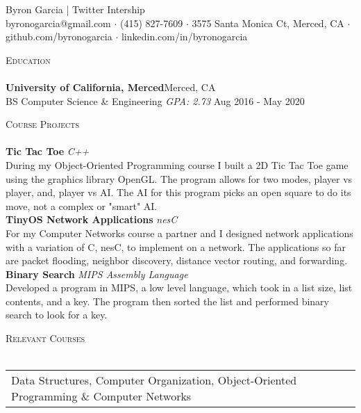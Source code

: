 \documentclass[a4paper]{article}
\newcommand{\lineunder} {
    \vspace*{-8pt} \\
    \hspace*{-18pt} \hrulefill \\
}
\newcommand{\header} [1] {
    {\hspace*{-18pt}\vspace*{6pt} \textsc{#1}}
    \vspace*{-6pt} \lineunder
}
\begin{document}
\vspace*{-40pt}

    

\vspace*{-10pt}
\begin{center}
	{\Huge {Byron Garcia |} \textcolor {twit}{Twitter Intership}}\\
	byronogarcia@gmail.com $\cdot$ (415) 827-7609 $\cdot$ 3575 Santa Monica Ct, Merced, CA $\cdot$ github.com/byronogarcia $\cdot$ linkedin.com/in/byronogarcia \\
\end{center}

\header{Education}
\textbf{University of California, Merced}\hfill Merced, CA\\
BS Computer Science \& Engineering \textit{GPA: 2.73} \hfill Aug 2016 - May 2020\\
\vspace{3mm}

\header{Course Projects}
{\textbf{Tic Tac Toe}} {\sl C++} \\
During my Object-Oriented Programming course I built a 2D Tic Tac Toe game using the graphics library OpenGL. The program allows for two modes, player vs player, and, player vs AI. The AI for this program picks an open square to do its move, not a complex or "smart" AI.\\
\vspace*{3mm}
{\textbf{TinyOS Network Applications}} {\sl nesC} \\
For my Computer Networks course a partner and I designed network applications with a variation of C, nesC, to implement on a network. The applications so far are packet flooding, neighbor discovery, distance vector routing, and forwarding.\\
\vspace*{3mm}
{\textbf{Binary Search}} {\sl MIPS Assembly Language} \\
Developed a program in MIPS, a low level language, which took in a list size, list contents, and a key. The program then sorted the list and performed binary search to look for a key.\\
\vspace*{3mm}

\header{Relevant Courses}
\begin{tabular}{ l l }
Data Structures, Computer Organization, Object-Oriented Programming \& Computer Networks
\end{tabular}
\vspace{3mm}
\end{document}
